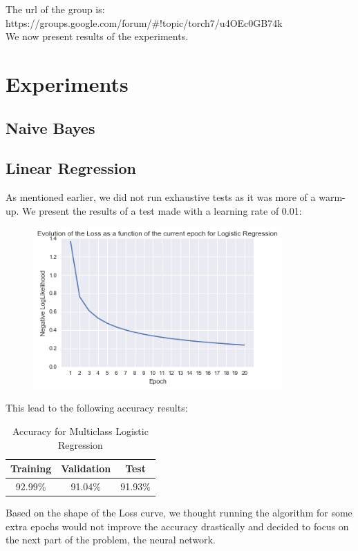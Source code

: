 \documentclass[11pt]{article}
\begin{document}
\noindent The url of the group is: https://groups.google.com/forum/\#!topic/torch7/u4OEc0GB74k\\

\noindent We now present results of the experiments.

\section{Experiments}

\subsection{Naive Bayes}

\subsection{Linear Regression}
As mentioned earlier, we did not run exhaustive tests as it was more of a warm-up. We present the results of a test made with a learning rate of 0.01:

\begin{figure}[h]
\centering
\includegraphics[width=9.5cm]{logReg_err}
\end{figure}

\noindent This lead to the following accuracy results:

\begin{table}[H]
\centering
\label{my-label}
\begin{tabular}{|c|c|c|}
\hline
Training & Validation & Test    \\ \hline
92.99\%  & 91.04\%    & 91.93\% \\ \hline
\end{tabular}
\caption{Accuracy for Multiclass Logistic Regression}
\end{table}

\noindent Based on the shape of the Loss curve, we thought running the algorithm for some extra epochs would not improve the accuracy drastically and decided to focus on the next part of the problem, the neural network.
\end{document}
